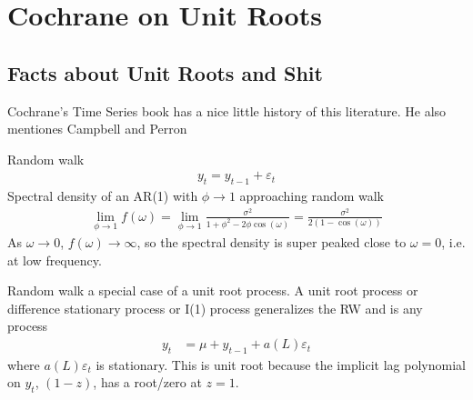 \documentclass[12pt]{article}
\theoremstyle{plain}
\theoremstyle{definition}
\theoremstyle{remark}
\newcommand{\ra}{\rightarrow}
\begin{document}







\clearpage
\section{Cochrane on Unit Roots}

\subsection{Facts about Unit Roots and Shit}

Cochrane's Time Series book has a nice little history of this
literature. He also mentiones Campbell and Perron

Random walk
\begin{align}
  y_t = y_{t-1} + \varepsilon_t
  \label{rw}
\end{align}
Spectral density of an AR(1) with $\phi\ra 1$ approaching random walk
\begin{align*}
  \lim_{\phi\ra 1}f(\omega)
  =
  \lim_{\phi\ra 1}
  \frac{\sigma^2}{1+\phi^2-2\phi \cos(\omega)}
  =
  \frac{\sigma^2}{2(1-\cos(\omega))}
\end{align*}
As $\omega\ra 0$, $f(\omega)\ra \infty$, so the spectral density is
super peaked close to $\omega=0$, i.e. at low frequency.

Random walk a special case of a unit root process. A unit root process
or difference stationary process or I(1) process generalizes the RW and
is any process
\begin{align}
  y_t &= \mu + y_{t-1} + a(L)\varepsilon_t
  \label{I1}
\end{align}
where $a(L)\varepsilon_t$ is stationary.
This is unit root because the implicit lag polynomial on $y_t$,
$(1-z)$, has a root/zero at $z=1$.
\end{document}
